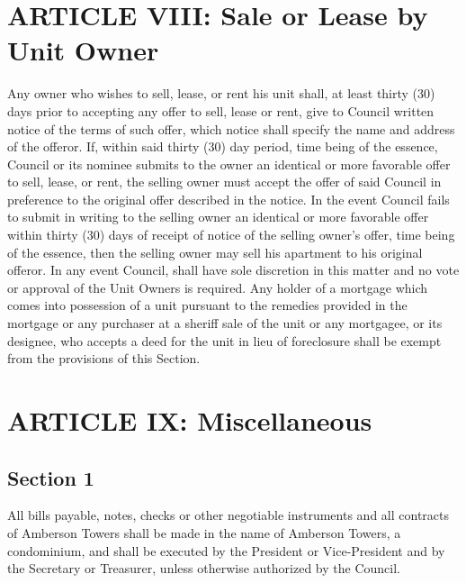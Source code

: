 \documentclass[
  14pt,
]{book}
\begin{document}
\hypertarget{article-viii-sale-or-lease-by-unit-owner}{%
\section*{ARTICLE VIII: Sale or Lease by Unit Owner}\label{article-viii-sale-or-lease-by-unit-owner}}

Any owner who wishes to sell, lease, or rent his unit shall, at least thirty (30) days prior to accepting any offer to sell, lease or rent, give to Council written notice of the terms of such offer, which notice shall specify the name and address of the offeror. If, within said thirty (30) day period, time being of the essence, Council or its nominee submits to the owner an identical or more favorable offer to sell, lease, or rent, the selling owner must accept the offer of said Council in preference to the original offer described in the notice. In the event Council fails to submit in writing to the selling owner an identical or more favorable offer within thirty (30) days of receipt of notice of the selling owner's offer, time being of the essence, then the selling owner may sell his apartment to his original offeror. In any event Council, shall have sole discretion in this matter and no vote or approval of the Unit Owners is required. Any holder of a mortgage which comes into possession of a unit pursuant to the remedies provided in the mortgage or any purchaser at a sheriff sale of the unit or any mortgagee, or its designee, who accepts a deed for the unit in lieu of foreclosure shall be exempt from the provisions of this Section.

\hypertarget{article-ix-miscellaneous}{%
\section*{ARTICLE IX: Miscellaneous}\label{article-ix-miscellaneous}}

\hypertarget{section-1-7}{%
\subsection*{Section 1}\label{section-1-7}}

All bills payable, notes, checks or other negotiable instruments and all contracts of Amberson Towers shall be made in the name of Amberson Towers, a condominium, and shall be executed by the President or Vice-President and by the Secretary or Treasurer, unless otherwise authorized by the Council.
\end{document}
